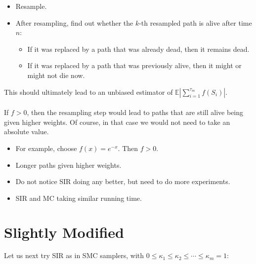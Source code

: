 \documentclass{article}
\begin{document}
\begin{itemize}
\begin{itemize}
\item Resample.

\item After resampling, find out whether the $k$-th resampled path is alive after time $n$:
\begin{itemize}
\item If it was replaced by a path that was already dead, then it remains dead.
\item If it was replaced by a path that was previously alive, then it might or might not die now.
\end{itemize} 

\end{itemize}

\end{itemize}
This should ultimately lead to an unbiased estimator of $\mathbb{E} \left | \sum_{i=1}^{\tau_{m}} f(S_{i}) \right |$. 
\\ \\
If $f >0$, then the resampling step would lead to paths that are still alive being given higher weights. Of course, in that case we would not need to take an absolute value. 

\begin{itemize}

\item For example, choose $f(x) = e^{-x}$. Then $f > 0$.
\item Longer paths given higher weights.
\item Do not notice SIR doing any better, but need to do more experiments.
\item SIR and MC taking similar running time.

\end{itemize}

\section{Slightly Modified}

Let us next try SIR as in SMC samplers, with $0 \leq \kappa_{1} \leq \kappa_{2} \leq \cdots \leq \kappa_{m} = 1$:
\end{document}
